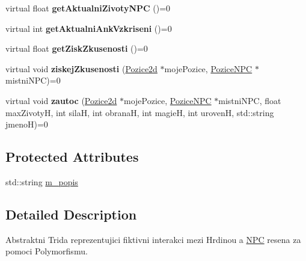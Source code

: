 \begin{DoxyCompactItemize}
\item 
\hypertarget{class_interakce_n_p_c_a889074416ef0b0f2b397baef2c4d1363}{virtual float {\bfseries get\-Aktualni\-Zivoty\-N\-P\-C} ()=0}\label{class_interakce_n_p_c_a889074416ef0b0f2b397baef2c4d1363}

\item 
\hypertarget{class_interakce_n_p_c_a4d0ff207eb0de5188ba74438c1f053e6}{virtual int {\bfseries get\-Aktualni\-Ank\-Vzkriseni} ()=0}\label{class_interakce_n_p_c_a4d0ff207eb0de5188ba74438c1f053e6}

\item 
\hypertarget{class_interakce_n_p_c_af1f8e9a1c55fd06260be921931c380a7}{virtual float {\bfseries get\-Zisk\-Zkusenosti} ()=0}\label{class_interakce_n_p_c_af1f8e9a1c55fd06260be921931c380a7}

\item 
\hypertarget{class_interakce_n_p_c_a0d557184b6efb621303c947bca503f3b}{virtual void {\bfseries ziskej\-Zkusenosti} (\hyperlink{struct_pozice2d}{Pozice2d} $\ast$moje\-Pozice, \hyperlink{class_pozice_n_p_c}{Pozice\-N\-P\-C} $\ast$mistni\-N\-P\-C)=0}\label{class_interakce_n_p_c_a0d557184b6efb621303c947bca503f3b}

\item 
\hypertarget{class_interakce_n_p_c_add01dd2c4ec4cc9a76cf9547f7bcd8f4}{virtual void {\bfseries zautoc} (\hyperlink{struct_pozice2d}{Pozice2d} $\ast$moje\-Pozice, \hyperlink{class_pozice_n_p_c}{Pozice\-N\-P\-C} $\ast$mistni\-N\-P\-C, float max\-Zivoty\-H, int sila\-H, int obrana\-H, int magie\-H, int uroven\-H, std\-::string jmeno\-H)=0}\label{class_interakce_n_p_c_add01dd2c4ec4cc9a76cf9547f7bcd8f4}

\end{DoxyCompactItemize}
\subsection*{Protected Attributes}
\begin{DoxyCompactItemize}
\item 
std\-::string \hyperlink{class_interakce_n_p_c_ad104454fab5bd9ac2ab5c5c36eceb2b3}{m\-\_\-popis}
\end{DoxyCompactItemize}


\subsection{Detailed Description}
Abstraktni Trida reprezentujici fiktivni interakci mezi Hrdinou a \hyperlink{class_n_p_c}{N\-P\-C} resena za pomoci Polymorfismu. 


